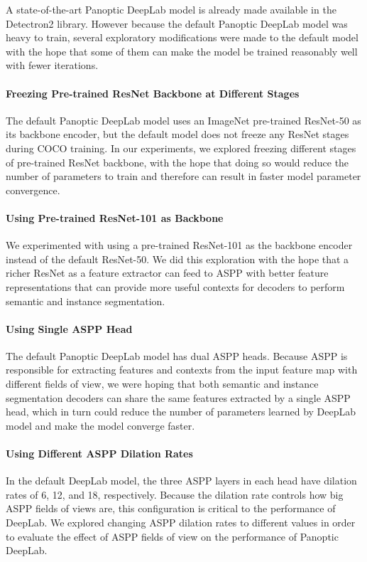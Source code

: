 \documentclass[10pt,twocolumn,letterpaper]{article}
\begin{document}
A state-of-the-art Panoptic DeepLab model is already made available in the Detectron2 library. However because the default Panoptic DeepLab model was heavy to train, several exploratory modifications were made to the default model with the hope that some of them can make the model be trained reasonably well with fewer iterations. 

\paragraph{Freezing Pre-trained ResNet Backbone at Different Stages} The default Panoptic DeepLab model uses an ImageNet pre-trained ResNet-50 as its backbone encoder, but the default model does not freeze any ResNet stages during COCO training. In our experiments, we explored freezing different stages of pre-trained ResNet backbone, with the hope that doing so would reduce the number of parameters to train and therefore can result in faster model parameter convergence.

\paragraph{Using Pre-trained ResNet-101 as Backbone} We experimented with using a pre-trained ResNet-101 as the backbone encoder instead of the default ResNet-50. We did this exploration with the hope that a richer ResNet as a feature extractor can feed to ASPP with better feature representations that can provide more useful contexts for decoders to perform semantic and instance segmentation.

\paragraph{Using Single ASPP Head} The default Panoptic DeepLab model has dual ASPP heads. Because ASPP is responsible for extracting features and contexts from the input feature map with different fields of view, we were hoping that both semantic and instance segmentation decoders can share the same features extracted by a single ASPP head, which in turn could reduce the number of parameters learned by DeepLab model and make the model converge faster.

\paragraph{Using Different ASPP Dilation Rates} In the default DeepLab model, the three ASPP layers in each head have dilation rates of 6, 12, and 18, respectively. Because the dilation rate controls how big ASPP fields of views are, this configuration is critical to the performance of DeepLab. We explored changing ASPP dilation rates to different values in order to evaluate the effect of ASPP fields of view on the performance of Panoptic DeepLab.
\end{document}
